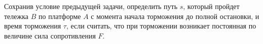 Сохранив условие предыдущей задачи, определить путь $s$, который пройдет тележка $B$ по платформе $A$ с момента
начала торможения до полной остановки, и время торможения $\tau$, если считать, что при торможении возникает постоянная по
величине сила сопротивления $F$. 

